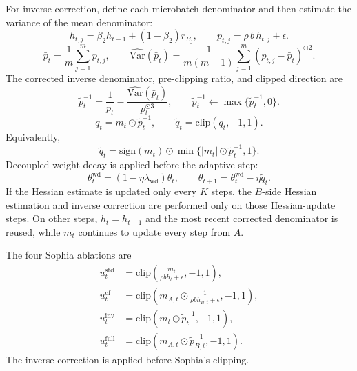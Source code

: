 \documentclass{article}
\newcommand{\Var}{\mathrm{Var}}
\begin{document}
For inverse correction, define each microbatch denominator and then estimate the variance of the mean denominator:
\begin{equation}
    h_{t,j}
    =
    \beta_2h_{t-1}+(1-\beta_2)r_{B_j},
    \qquad
    p_{t,j}
    =
    \rho\, b\, h_{t,j}+\epsilon.
\end{equation}
\begin{equation}
    \bar p_t
    =
    \frac{1}{m}\sum_{j=1}^m p_{t,j},
    \qquad
    \widehat{\Var}(\bar p_t)
    =
    \frac{1}{m(m-1)}\sum_{j=1}^m(p_{t,j}-\bar p_t)^{\odot 2}.
\end{equation}
The corrected inverse denominator, pre-clipping ratio, and clipped direction are
\begin{equation}
    \widetilde p_t^{-1}
    =
    \frac{1}{p_t}
    -
    \frac{\widehat{\Var}(\bar p_t)}{p_t^{\odot 3}},
    \qquad
    \widetilde p_t^{-1}\leftarrow \max\{\widetilde p_t^{-1},0\}.
\end{equation}
\begin{equation}
    q_t
    =
    m_t\odot \widetilde p_t^{-1},
    \qquad
    \widetilde q_t
    =
    \mathrm{clip}(q_t,-1,1).
\end{equation}
Equivalently,
\begin{equation}
    \widetilde q_t
    =
    \mathrm{sign}(m_t)\odot \min\{|m_t|\odot \widetilde p_t^{-1},1\}.
\end{equation}
Decoupled weight decay is applied before the adaptive step:
\begin{equation}
    \theta_t^{\mathrm{wd}}
    =
    (1-\eta\lambda_{\mathrm{wd}})\theta_t,
    \qquad
    \theta_{t+1}
    =
    \theta_t^{\mathrm{wd}}-\eta\widetilde q_t.
\end{equation}
If the Hessian estimate is updated only every $K$ steps, the $B$-side Hessian estimation and inverse correction are performed only on those Hessian-update steps. On other steps, $h_t=h_{t-1}$ and the most recent corrected denominator is reused, while $m_t$ continues to update every step from $A$.

The four Sophia ablations are
\begin{align}
    u_t^{\mathrm{std}}
    &=
    \mathrm{clip}\left(\frac{m_t}{\rho b h_t+\epsilon},-1,1\right), \\
    u_t^{\mathrm{cf}}
    &=
    \mathrm{clip}\left(m_{A,t}\odot\frac{1}{\rho b h_{B,t}+\epsilon},-1,1\right), \\
    u_t^{\mathrm{inv}}
    &=
    \mathrm{clip}\left(m_t\odot\widetilde p_t^{-1},-1,1\right), \\
    u_t^{\mathrm{full}}
    &=
    \mathrm{clip}\left(m_{A,t}\odot\widetilde p_{B,t}^{-1},-1,1\right).
\end{align}
The inverse correction is applied before Sophia's clipping.
\end{document}
